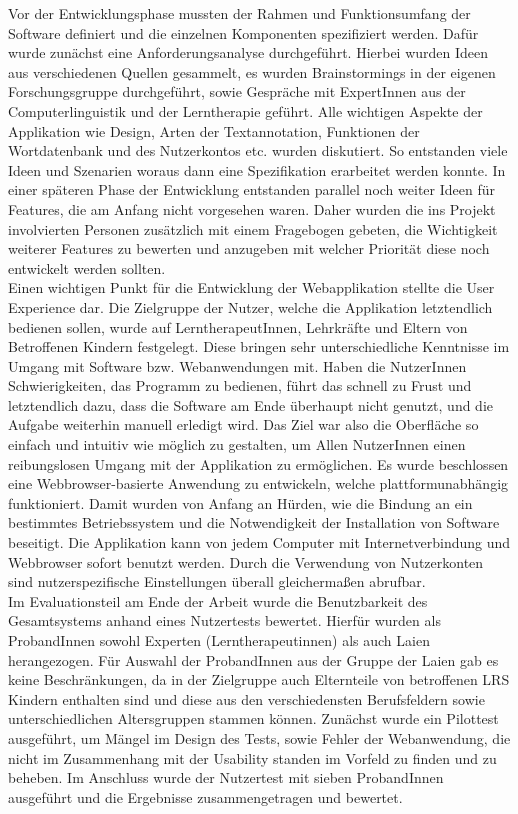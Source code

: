 Vor der Entwicklungsphase mussten der Rahmen und Funktionsumfang der Software definiert und die einzelnen Komponenten spezifiziert werden. Dafür wurde zunächst eine Anforderungsanalyse durchgeführt. Hierbei wurden Ideen aus verschiedenen Quellen gesammelt, es wurden Brainstormings in der eigenen Forschungsgruppe durchgeführt, sowie Gespräche mit ExpertInnen aus der Computerlinguistik und der Lerntherapie geführt. Alle wichtigen Aspekte der Applikation wie Design, Arten der Textannotation, Funktionen der Wortdatenbank und des Nutzerkontos etc. wurden diskutiert. So entstanden viele Ideen und Szenarien woraus dann eine Spezifikation erarbeitet werden konnte. In einer späteren Phase der Entwicklung entstanden parallel noch weiter Ideen für Features, die am Anfang nicht vorgesehen waren. Daher wurden die ins Projekt involvierten Personen zusätzlich mit einem Fragebogen gebeten, die Wichtigkeit weiterer Features zu bewerten und anzugeben mit welcher Priorität diese noch entwickelt werden sollten.\\
Einen wichtigen Punkt für die Entwicklung der Webapplikation stellte die User Experience dar. Die Zielgruppe der Nutzer, welche die Applikation letztendlich bedienen sollen, wurde auf LerntherapeutInnen, Lehrkräfte und Eltern von Betroffenen Kindern festgelegt. Diese bringen sehr unterschiedliche Kenntnisse im Umgang mit Software bzw. Webanwendungen mit. Haben die NutzerInnen Schwierigkeiten, das Programm zu bedienen, führt das schnell zu Frust und letztendlich dazu, dass die Software am Ende überhaupt nicht genutzt, und die Aufgabe weiterhin manuell erledigt wird.  Das Ziel war also die Oberfläche so einfach und intuitiv wie möglich zu gestalten, um Allen NutzerInnen einen reibungslosen Umgang mit der Applikation zu ermöglichen. Es wurde beschlossen eine Webbrowser-basierte Anwendung zu entwickeln, welche plattformunabhängig funktioniert. Damit wurden von Anfang an Hürden, wie die Bindung an ein bestimmtes Betriebssystem und die Notwendigkeit der Installation von Software beseitigt. Die Applikation kann von jedem Computer mit Internetverbindung und Webbrowser sofort benutzt werden. Durch die Verwendung von Nutzerkonten sind nutzerspezifische Einstellungen überall gleichermaßen abrufbar.\\

Im Evaluationsteil am Ende der Arbeit wurde die Benutzbarkeit des Gesamtsystems anhand eines Nutzertests bewertet. Hierfür wurden als ProbandInnen sowohl Experten (Lerntherapeutinnen) als auch Laien herangezogen. Für Auswahl der ProbandInnen aus der Gruppe der Laien gab es keine Beschränkungen, da in der Zielgruppe auch Elternteile von betroffenen LRS Kindern enthalten sind und diese aus den verschiedensten Berufsfeldern sowie unterschiedlichen Altersgruppen stammen können. Zunächst wurde ein Pilottest ausgeführt, um Mängel im Design des Tests, sowie Fehler der Webanwendung, die nicht im Zusammenhang mit der Usability standen im Vorfeld zu finden und zu beheben. Im Anschluss wurde der Nutzertest mit sieben ProbandInnen ausgeführt und die Ergebnisse zusammengetragen und bewertet.\\

